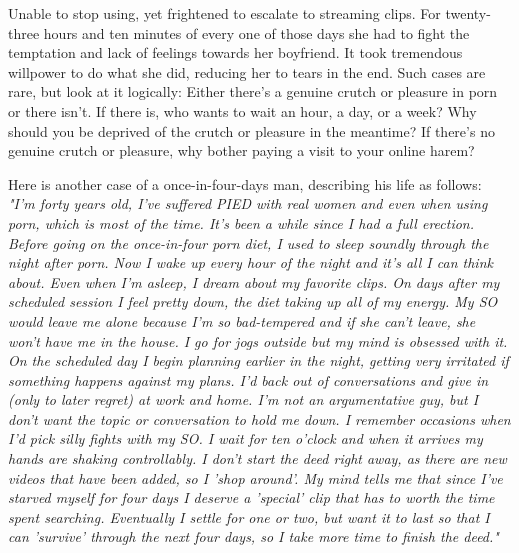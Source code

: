 \documentclass[easypeasy]{subfiles}
\begin{document}
Unable to stop using, yet frightened to escalate to streaming clips. For twenty-three hours and ten minutes of every one of those days she had to fight the temptation and lack of feelings towards her boyfriend. It took tremendous willpower to do what she did, reducing her to tears in the end. Such cases are rare, but look at it logically: Either there's a genuine crutch or pleasure in porn or there isn't. If there is, who wants to wait an hour, a day, or a week? Why should you be deprived of the crutch or pleasure in the meantime? If there's no genuine crutch or pleasure, why bother paying a visit to your online harem?

  Here is another case of a once-in-four-days man, describing his life as follows:\\

  \textit{"I'm forty years old, I've suffered PIED with real women and even when using porn, which is most of the time. It's been a while since I had a full erection. Before going on the once-in-four porn diet, I used to sleep soundly through the night after porn. Now I wake up every hour of the night and it's all I can think about. Even when I'm asleep, I dream about my favorite clips. On days after my scheduled session I feel pretty down, the diet taking up all of my energy. My SO would leave me alone because I'm so bad-tempered and if she can't leave, she won't have me in the house. I go for jogs outside but my mind is obsessed with it. On the scheduled day I begin planning earlier in the night, getting very irritated if something happens against my plans. I'd back out of conversations and give in (only to later regret) at work and home. I'm not an argumentative guy, but I don't want the topic or conversation to hold me down. I remember occasions when I'd pick silly fights with my SO. I wait for ten o'clock and when it arrives my hands are shaking controllably. I don't start the deed right away, as there are new videos that have been added, so I 'shop around'. My mind tells me that since I've starved myself for four days I deserve a 'special' clip that has to worth the time spent searching. Eventually I settle for one or two, but want it to last so that I can 'survive' through the next four days, so I take more time to finish the deed."}\\
\end{document}
